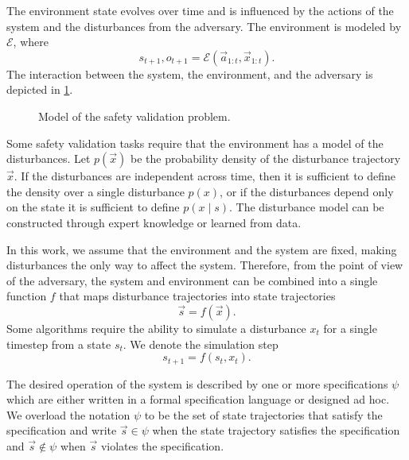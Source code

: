 The environment state evolves over time and is influenced by the actions of the system and the disturbances from the adversary. The environment is modeled by $\mathcal{E}$, where
\begin{equation}
    s_{t+1}, o_{t+1} = \mathcal{E}(\vec{a}_{1:t}, \vec{x}_{1:t}) \text{.} \label{eq:environment}
\end{equation} 
The interaction between the system, the environment, and the adversary is depicted in \cref{fig:problem}.

\begin{figure}[!t]
\centering
\resizebox{\columnwidth}{!}{}
\caption{Model of the safety validation problem.}
\label{fig:problem}
\end{figure}

Some safety validation tasks require that the environment has a model of the disturbances. Let $p(\vec{x})$ be the probability density of the disturbance trajectory $\vec{x}$. If the disturbances are independent across time, then it is sufficient to define the density over a single disturbance $p(x)$, or if the disturbances depend only on the state it is sufficient to define $p(x \mid s)$. The disturbance model can be constructed through expert knowledge or learned from data.

In this work, we assume that the environment and the system are fixed, making disturbances the only way to affect the system. Therefore, from the point of view of the adversary, the system and environment can be combined into a single function $f$ that maps disturbance trajectories into state trajectories
\begin{equation}
\vec{s} = f(\vec{x}) \text{.}
\end{equation}
Some algorithms require the ability to simulate a disturbance $x_t$ for a single timestep from a state $s_t$. We denote the simulation step
\begin{equation}
    s_{t+1} = f(s_t, x_t) \text{.}
\end{equation}

The desired operation of the system is described by one or more specifications $\psi$ which are either written in a formal specification language or designed ad hoc. We overload the notation $\psi$ to be the set of state trajectories that satisfy the specification and write $\vec{s} \in \psi$ when the state trajectory satisfies the specification and $\vec{s} \not \in \psi$ when $\vec{s}$ violates the specification.

